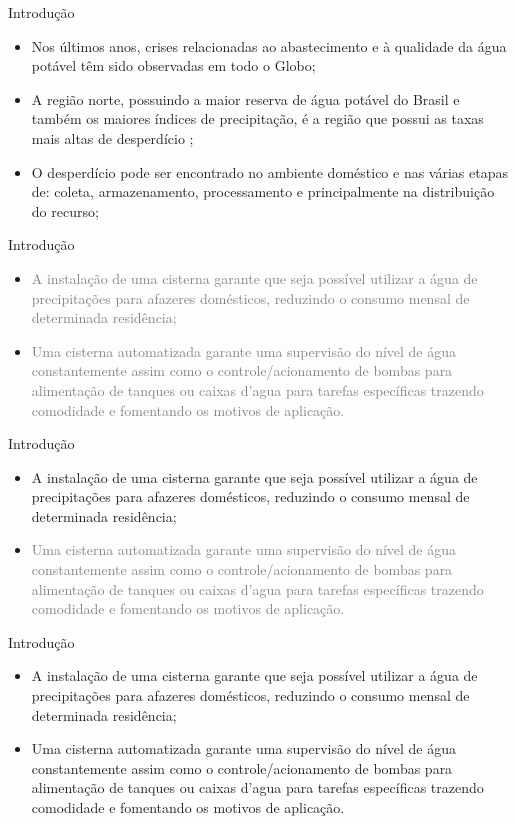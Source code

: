 \begin{frame}{Introdução}
    \begin{itemize}
    \item {Nos últimos anos, crises relacionadas ao abastecimento e à qualidade da água potável têm sido observadas em todo o Globo;}
    \item {A região norte, possuindo a maior reserva de água potável do Brasil e também os maiores índices de precipitação, é a região que possui as taxas mais altas de desperdício \cite{globo};}
    \item {O desperdício pode ser encontrado no ambiente doméstico e nas várias etapas de: coleta, armazenamento, processamento e principalmente na distribuição do recurso;}
    \end{itemize}
\end{frame}

\begin{frame}{Introdução}
    \begin{itemize}
        \item \textcolor{gray} {A instalação de uma cisterna garante que seja possível utilizar a água de precipitações para afazeres domésticos, reduzindo o consumo mensal de determinada residência;}
        \item \textcolor{gray}{Uma cisterna automatizada garante uma supervisão do nível de água constantemente assim como o controle/acionamento de bombas para alimentação de tanques ou caixas d’agua para tarefas específicas trazendo comodidade e fomentando os motivos de aplicação.}
    \end{itemize}
\end{frame}

\begin{frame}{Introdução}
    \begin{itemize}
        \item {A instalação de uma cisterna garante que seja possível utilizar a água de precipitações para afazeres domésticos, reduzindo o consumo mensal de determinada residência;}
        \item \textcolor{gray}{Uma cisterna automatizada garante uma supervisão do nível de água constantemente assim como o controle/acionamento de bombas para alimentação de tanques ou caixas d’agua para tarefas específicas trazendo comodidade e fomentando os motivos de aplicação.}
    \end{itemize}
\end{frame}

\begin{frame}{Introdução}
    \begin{itemize}
        \item {A instalação de uma cisterna garante que seja possível utilizar a água de precipitações para afazeres domésticos, reduzindo o consumo mensal de determinada residência;}
        \item {Uma cisterna automatizada garante uma supervisão do nível de água constantemente assim como o controle/acionamento de bombas para alimentação de tanques ou caixas d’agua para tarefas específicas trazendo comodidade e fomentando os motivos de aplicação.}
    \end{itemize}
\end{frame}